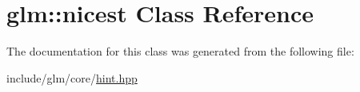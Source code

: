 \hypertarget{classglm_1_1nicest}{\section{glm\-:\-:nicest \-Class \-Reference}
\label{classglm_1_1nicest}
}


\-The documentation for this class was generated from the following file\-:\begin{DoxyCompactItemize}
\item 
include/glm/core/\hyperlink{hint_8hpp}{hint.\-hpp}\end{DoxyCompactItemize}
